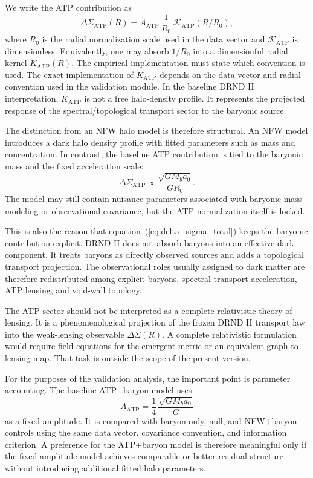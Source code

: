 \documentclass[12pt]{iopart}
\begin{document}
We write the ATP contribution as
\begin{equation}
\Delta\Sigma_{\mathrm{ATP}}(R)
=
A_{\mathrm{ATP}}\,
\frac{1}{R_0}\,
\mathcal{K}_{\mathrm{ATP}}(R/R_0),
\label{eq:delta_sigma_atp_kernel}
\end{equation}
where \(R_0\) is the radial normalization scale used in the data vector and \(\mathcal{K}_{\mathrm{ATP}}\) is dimensionless. Equivalently, one may absorb \(1/R_0\) into a dimensionful radial kernel \(K_{\mathrm{ATP}}(R)\). The empirical implementation must state which convention is used. The exact implementation of \(K_{\mathrm{ATP}}\) depends on the data vector and radial convention used in the validation module. In the baseline DRND II interpretation, \(K_{\mathrm{ATP}}\) is not a free halo-density profile. It represents the projected response of the spectral/topological transport sector to the baryonic source.

The distinction from an NFW halo model is therefore structural. An NFW model introduces a dark halo density profile with fitted parameters such as mass and concentration. In contrast, the baseline ATP contribution is tied to the baryonic mass and the fixed acceleration scale:
\begin{equation}
\Delta\Sigma_{\mathrm{ATP}}
\propto
\frac{\sqrt{GM_ba_0}}{G R_0}.
\end{equation}
The model may still contain nuisance parameters associated with baryonic mass modeling or observational covariance, but the ATP normalization itself is locked.

This is also the reason that equation~(\ref{eq:delta_sigma_total}) keeps the baryonic contribution explicit. DRND II does not absorb baryons into an effective dark component. It treats baryons as directly observed sources and adds a topological transport projection. The observational roles usually assigned to dark matter are therefore redistributed among explicit baryons, spectral-transport acceleration, ATP lensing, and void-wall topology.

The ATP sector should not be interpreted as a complete relativistic theory of lensing. It is a phenomenological projection of the frozen DRND II transport law into the weak-lensing observable \(\Delta\Sigma(R)\). A complete relativistic formulation would require field equations for the emergent metric or an equivalent graph-to-lensing map. That task is outside the scope of the present version.

For the purposes of the validation analysis, the important point is parameter accounting. The baseline ATP+baryon model uses
\begin{equation}
A_{\mathrm{ATP}}
=
\frac14\,
\frac{\sqrt{GM_ba_0}}{G}
\end{equation}
as a fixed amplitude. It is compared with baryon-only, null, and NFW+baryon controls using the same data vector, covariance convention, and information criterion. A preference for the ATP+baryon model is therefore meaningful only if the fixed-amplitude model achieves comparable or better residual structure without introducing additional fitted halo parameters.
\end{document}
